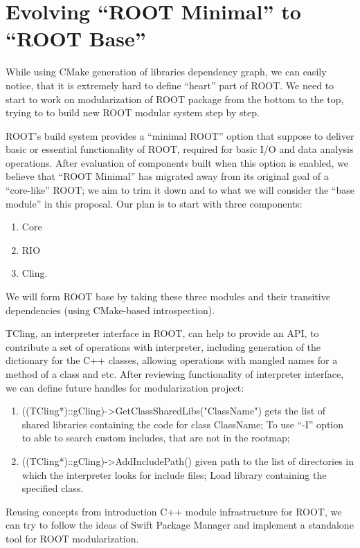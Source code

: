 \documentclass{webofc}
\begin{document}
\section{Evolving “ROOT Minimal” to “ROOT Base”}

While using CMake generation of libraries dependency graph, we can easily notice, that it is extremely hard to define “heart” part of ROOT. We need to start to work on modularization of ROOT package from the bottom to the top, trying to to build new ROOT modular system step by step.

ROOT’s build system provides a “minimal ROOT” option that suppose to deliver basic or essential functionality of ROOT, required for basic I/O and data analysis operations.
After evaluation of components built when this option is enabled, we believe that “ROOT Minimal” has migrated away from its original goal of a “core-like” ROOT; we aim to trim it down and to what we will consider the “base module” in this proposal.
Our plan is to start with three components:
\begin{enumerate}
\item Core
\item RIO
\item Cling.
\end{enumerate}

We will form ROOT base by taking these three modules and their transitive dependencies (using CMake-based introspection).

TCling, an interpreter interface in ROOT, can help to provide an API, to contribute a set of operations with interpreter, including generation of the dictionary for the C++ classes, allowing operations with mangled names for a method of a class and etc.
After reviewing functionality of interpreter interface, we can define future handles for modularization project:
\begin{enumerate}
\item ((TCling*)::gCling)->GetClassSharedLibs("ClassName") gets the list of shared libraries containing the code for class ClassName;
To use “-I” option to able to search custom includes, that are not in the rootmap;
\item ((TCling*)::gCling)->AddIncludePath() given path to the list of directories in which the interpreter looks for include files;
Load library containing the specified class.
\end{enumerate}

Reusing concepts from introduction C++ module infrastructure for ROOT, we can try to follow the ideas of Swift Package Manager and implement a standalone tool for ROOT modularization.
\end{document}
